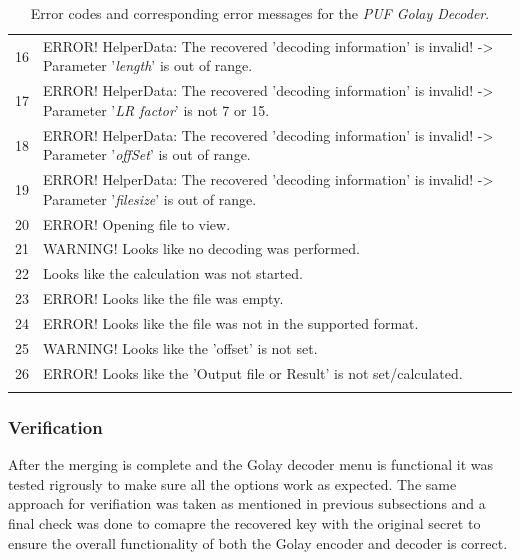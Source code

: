 \begin{table}[!ht]
\begin{center}
\begin{tabular}{cp{13cm}}
	16 & ERROR! HelperData: The recovered 'decoding information' is invalid! -> Parameter '\emph{length}' is out of range.\\

	17 & ERROR! HelperData: The recovered 'decoding information' is invalid! -> Parameter '\emph{LR factor}' is not 7 or 15.\\

	18 & ERROR! HelperData: The recovered 'decoding information' is invalid! -> Parameter '\emph{offSet}' is out of range.\\

	19 & ERROR! HelperData: The recovered 'decoding information' is invalid! -> Parameter '\emph{filesize}' is out of range.\\

	20 & ERROR! Opening file to view.\\

	21 & WARNING! Looks like no decoding was performed.\\

	22 & Looks like the calculation was not started.\\

	23 & ERROR! Looks like the file was empty.\\

	24 & ERROR! Looks like the file was not in the supported format.\\

	25 & WARNING! Looks like the 'offset' is not set.\\

	26 & ERROR! Looks like the 'Output file or Result' is not set/calculated.\\
	\addlinespace
	\bottomrule
	\end{tabular}
	\end{center}
	\caption{Error codes and corresponding error messages for the \emph{PUF Golay Decoder}.}
	\label{tab:Golay_dec_errors}
	\end{table}

	\subsubsection{Verification}
	After the merging is complete and the Golay decoder menu is functional it was tested rigrously to make sure all the options work as expected. The same approach for verifiation was taken as mentioned in previous subsections and a final check was done to comapre the recovered key with the original secret to ensure the overall functionality of both the Golay encoder and decoder is correct.


